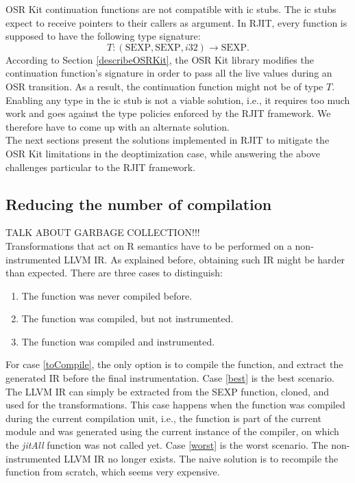 OSR Kit continuation functions are not compatible with ic stubs.
The ic stubs expect to receive pointers to their callers as argument.
In RJIT, every function is supposed to have the following type signature:
$$T: (\text{SEXP}, \text{SEXP}, i32) \rightarrow \text{SEXP}.$$
According to Section \ref{describeOSRKit}, the OSR Kit\cite{OSRKit} library modifies the continuation function's signature in order to pass all the live values during an OSR transition.
As a result, the continuation function might not be of type $T$.
Enabling any type in the ic stub is not a viable solution, i.e., it requires too much work and goes against the type policies enforced by the RJIT framework. 
We therefore have to come up with an alternate solution.\\

The next sections present the solutions implemented in RJIT to mitigate the OSR Kit limitations in the deoptimization case, while answering the above challenges particular to the RJIT framework.\\

\subsection{Reducing the number of compilation}\label{section:reducecompilations}
TALK ABOUT GARBAGE COLLECTION!!!\\

Transformations that act on R semantics have to be performed on a non-instrumented LLVM IR.
As explained before, obtaining such IR might be harder than expected. 
There are three cases to distinguish:
\begin{enumerate}
    \item The function was never compiled before.\label{toCompile}
    \item The function was compiled, but not instrumented.\label{best} 
    \item The function was compiled and instrumented.\label{worst}
\end{enumerate}

For case \ref{toCompile}, the only option is to compile the function, and extract the generated IR before the final instrumentation.
Case \ref{best} is the best scenario.
The LLVM IR can simply be extracted from the SEXP function, cloned, and used for the transformations.
This case happens when the function was compiled during the current compilation unit, i.e., the function is part of the current module and was generated using the current instance of the compiler, on which the \textit{jitAll} function was not called yet.
Case \ref{worst} is the worst scenario.
The non-instrumented LLVM IR no longer exists.
The naive solution is to recompile the function from scratch, which seems very expensive.\\

